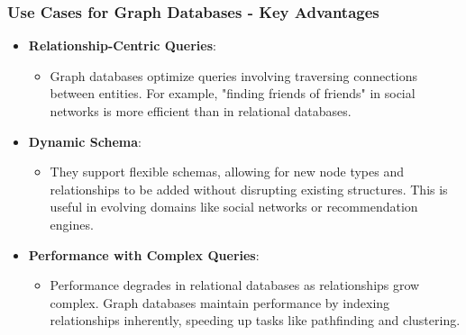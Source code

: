 \documentclass[aspectratio=169]{beamer}
\begin{document}
\begin{frame}[fragile]
    \frametitle{Use Cases for Graph Databases - Key Advantages}
    \begin{itemize}
        \item \textbf{Relationship-Centric Queries}:
        \begin{itemize}
            \item Graph databases optimize queries involving traversing connections between entities. For example, "finding friends of friends" in social networks is more efficient than in relational databases.
        \end{itemize}
        
        \item \textbf{Dynamic Schema}:
        \begin{itemize}
            \item They support flexible schemas, allowing for new node types and relationships to be added without disrupting existing structures. This is useful in evolving domains like social networks or recommendation engines.
        \end{itemize}
        
        \item \textbf{Performance with Complex Queries}:
        \begin{itemize}
            \item Performance degrades in relational databases as relationships grow complex. Graph databases maintain performance by indexing relationships inherently, speeding up tasks like pathfinding and clustering.
        \end{itemize}
    \end{itemize}
\end{frame}
\end{document}

